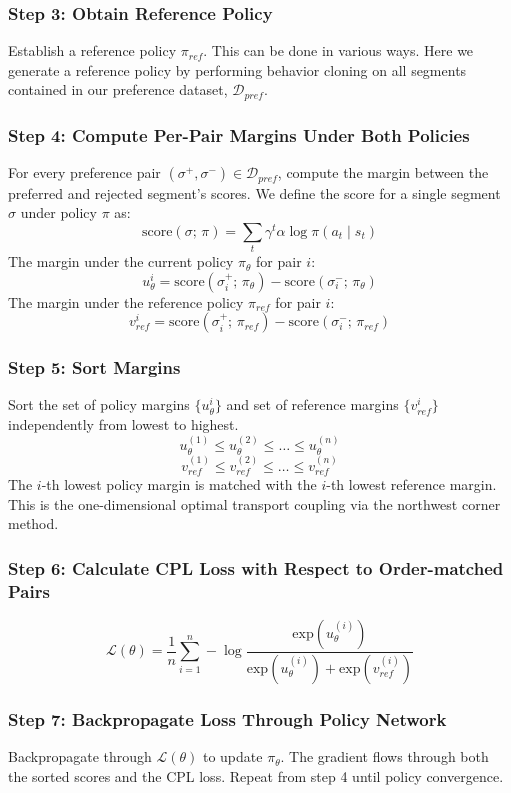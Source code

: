 \documentclass[11pt]{article}
\begin{document}
\subsubsection*{Step 3: Obtain Reference Policy}
Establish a reference policy $\pi_{ref}$. This can be done in various ways. Here we generate a reference policy by performing behavior cloning on all segments contained in our preference dataset, $\mathcal{D}_{pref}$.

\subsubsection*{Step 4: Compute Per-Pair Margins Under Both Policies}
For every preference pair $(\sigma^+,\sigma^-)\in\mathcal{D}_{pref}$, compute the margin between the preferred and rejected segment's scores. We define the score for a single segment $\sigma$ under policy $\pi$ as:
$$\text{score}(\sigma;\,\pi)=\sum_{t} \gamma^t \alpha \log \pi(a_t \mid s_t)$$
The margin under the current policy $\pi_{\theta}$ for pair $i$:
$$u_\theta^i = \text{score}(\sigma_i^+;\,\pi_\theta) - \text{score}(\sigma_i^-;\,\pi_\theta)$$
The margin under the reference policy $\pi_{ref}$ for pair $i$:
$$v_{ref}^i = \text{score}(\sigma_i^+;\,\pi_{ref}) - \text{score}(\sigma_i^-;\,\pi_{ref})$$

\subsubsection*{Step 5: Sort Margins}
Sort the set of policy margins $\{u_\theta^i\}$ and set of reference margins $\{v_{ref}^i\}$ independently from lowest to highest.
$$u_\theta^{(1)} \leq u_\theta^{(2)} \leq \ldots \leq u_\theta^{(n)}$$
$$v_{ref}^{(1)} \leq v_{ref}^{(2)} \leq \ldots \leq v_{ref}^{(n)}$$
The $i$-th lowest policy margin is matched with the $i$-th lowest reference margin. This is the one-dimensional optimal transport coupling via the northwest corner method.

\subsubsection*{Step 6: Calculate CPL Loss with Respect to Order-matched Pairs}
$$\mathcal{L}(\theta)=\frac{1}{n}\sum_{i=1}^{n}-\log \frac{\text{exp}(u_\theta^{(i)})}{\text{exp}(u_\theta^{(i)})+\text{exp}(v_{ref}^{(i)})}$$

\subsubsection*{Step 7: Backpropagate Loss Through Policy Network}
Backpropagate through $\mathcal{L}(\theta)$ to update $\pi_\theta$. The gradient flows through both the sorted scores and the CPL loss. Repeat from step 4 until policy convergence.
\newpage
\end{document}
